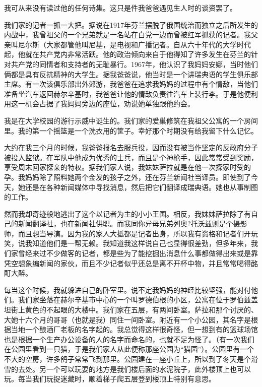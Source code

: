 我可从来没有读过他的任何诗集。这只是件我爸爸遇见生人时的谈资罢了。

我们家的记者一抓一大把。据说在1917年芬兰摆脱了俄国统治而独立之后所发生的内战中，我曾祖父的一个兄弟就是一名站在白党一边而曾被红军抓获的记者。我父亲叫尼尔斯（大家都管他叫尼基，是电视和广播记者。自从六十年代的大学时代起，他就在共产党内非常活跃。他的政治倾向来自于他得知了许多发生在芬兰的针对共产党的同情者和支持者的无耻暴行。1967年，他认识了我妈妈安娜，当时他们俩都是具有反抗精神的大学生。据我爸爸说，他当时是一个讲瑞典语的学生俱乐部主席。有一次该俱乐部出外郊游，我爸爸在追求我妈妈的过程中有个情敌，当他们准备坐汽车返回赫尔辛基时，我爸爸让他的情敌负责往汽车上装行李。于是他便利用这一机会占据了我妈妈旁边的座位，劝说她单独跟他约会。

我是在大学校园的游行示威中诞生的。我们家的爱巢修筑在我祖父公寓的一个房间里。我的第一个摇篮是一个洗衣用的筐子。幸好那个时期没有给我留下什么记忆。

大约在我三个月的时候，我爸爸报名去服兵役，因而没有被当作坚定的反政府分子被投入监狱。在军队中他成为优秀的士兵，而且是个神枪手，因此常常受到奖励，享受周末回家探亲的特权。据我们家人说，我妹妹萨拉就是在他一次探家时受的孕。我妈妈除了照料她两个金发的孩子之外，还在芬兰新闻社当译员。即使到了今天，她还是在各种新闻媒体中寻找消息，然后把它们翻译成瑞典语。她也从事制图的工作。

然而我却奇迹般地逃出了这个以记者为主的小小王国。相反，我妹妹萨拉除了有自己的新闻翻译社，也在新闻社供职。而我同你异母兄弟列奥?托沃兹则是个摄影师，而且想当导演。因为我的家人大抵都是记者出身，所以我有资格和记者们开玩笑，说我知道他们是一帮无赖。我知道我这样说自己也显得很差劲，但多年来，我们家曾经来过不少做客的记者，都是些为了能挖掘出消息什么事都做得出来或是靠凭空想象编新闻的家伙，而且不少记者似乎还总是离不开杯中物，并且常常喝得酩酊大醉。

每当这个时候，我就躲进自己的卧室里。说不定我妈妈的神经比较坚强，能对付他们。我们家坐落在赫尔辛基市中心的一个叫罗德伯根的小区，公寓在位于罗伯兹盖坦街上黄色的不起眼的大楼中。我们家在五层，有两间卧室。萨拉和那个讨厌的、大她十六个月的哥哥（也就是我）同住一间卧室。附近有一个小公园，其名字是根据当地一个酿酒厂老板的名字起的。我总觉得这样很奇怪，但一想到有的篮球场馆也是根据一个生产办公设备的人的名字而命名的，也就不足为怪了。（有一次我们在公园里看到一只猫，于是我们家人从此便称那座公园为“猫园”）。公园里有一个不大的空房，许多鸽子常常飞到那里。公园建在一座小丘上，所以到了冬天是个滑雪的去处。另一个可以玩耍的地方是我们楼后面的水泥院子，此外楼顶上也可以玩。每当我们玩捉迷藏时，顺着梯子爬五层登到楼顶上特别有意思。

